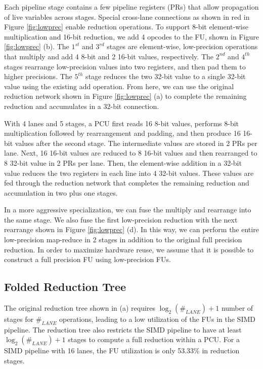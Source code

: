 Each pipeline stage contains a few pipeline registers (PRs)
  that allow propagation of live variables across stages.
Special cross-lane connections as shown in red in Figure \ref{fig:lowprec} enable reduction operations.
To support 8-bit element-wise multiplication and 16-bit reduction, we add 4 opcodes to the FU, shown in
Figure \ref{fig:lowprec} (b).
The $1^{st}$ and $3^{rd}$ stages are element-wise, low-precision operations
  that multiply and add 4 8-bit and 2 16-bit values, respectively.
The $2^{nd}$ and $4^{th}$ stages rearrange low-precision values into two registers,
  and then pad them to higher precisions.
The $5^{th}$ stage reduces the two 32-bit value to a single 32-bit value using the existing add operation. 
From here, we can use the original reduction network shown in Figure \ref{fig:lowprec} (a) to complete the remaining reduction and accumulates
in a 32-bit connection.

With 4 lanes and 5 stages,
  a PCU first reads 16 8-bit values,
  performs 8-bit multiplication followed by rearrangement and padding,
  and then produce 16 16-bit values after the second stage.
The intermediate values are stored in 2 PRs per lane.
Next, 16 16-bit values are reduced to 8 16-bit values
  and then rearranged to 8 32-bit value in 2 PRs per lane.
Then, the element-wise addition in a 32-bit value
  reduces the two registers in each line into 4 32-bit values.
These values are fed through the
  reduction network that completes the remaining
  reduction and accumulation in two plus one stages.

In a more aggressive specialization,
  we can fuse the multiply and rearrange into the same stage.
We also fuse the first low-precision reduction with the next rearrange shown in Figure \ref{fig:lowprec} (d).
In this way, we can perform the entire low-precision map-reduce in 2 stages in addition to the original full precision reduction.
In order to maximize hardware reuse,
  we assume that it is possible to construct a full precision FU
  using low-precision FUs.

\subsection{Folded Reduction Tree} \label{sec:foldrt}
The original reduction tree shown in  (a) requires $\log_2(\#_{LANE})+1$ number of
stages for $\#_{LANE}$ operations, leading to a low utilization of the FUs in the SIMD pipeline.
The reduction tree also restricts the SIMD pipeline to have at least 
$\log_2(\#_{LANE})+1$ stages to compute a full reduction within a PCU.
For a SIMD pipeline with 16 lanes, the FU utilization is only 53.33\% in reduction stages.

